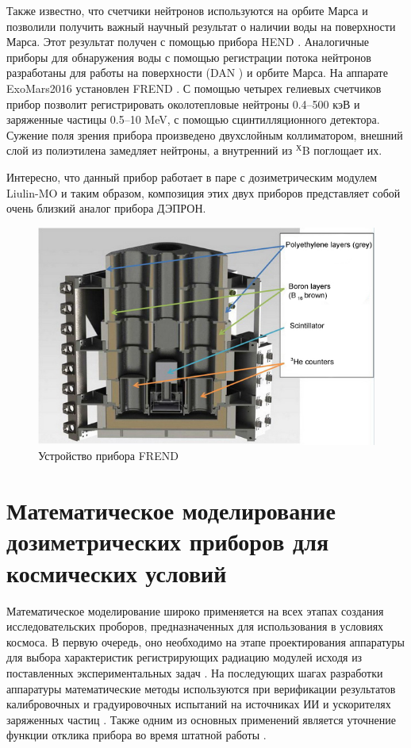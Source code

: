 Также известно, что счетчики нейтронов используются на орбите Марса и позволили получить важный научный результат о наличии воды на поверхности Марса.  Этот  результат получен с помощью прибора HEND \cite{Feldman2004}. Аналогичные приборы для обнаружения воды с помощью регистрации потока нейтронов разработаны для работы на поверхности (DAN \cite{Mitrofanov2012a}) и орбите Марса. На аппарате ExoMars2016 установлен FREND \cite{Mitrofanov2012}. С помощью четырех гелиевых счетчиков прибор позволит регистрировать околотепловые нейтроны 0.4–500 кэВ и заряженные частицы 0.5–10 MeV, с помощью сцинтилляционного детектора. Сужение поля зрения прибора произведено двухслойным коллиматором, внешний слой из полиэтилена замедляет нейтроны, а внутренний из $ ^Х $B поглощает их. 

Интересно, что данный прибор работает в паре с дозиметрическим модулем Liulin-MO и таким образом, композиция этих двух приборов представляет собой очень близкий аналог прибора ДЭПРОН.
\begin{figure}
	\centering
	\includegraphics[width=0.7\linewidth]{images/frend3-eng}
	\caption{Устройство прибора FREND \cite{Mitrofanov2012}}
	\label{fig:frend3-eng}
\end{figure}

\section{Математическое моделирование дозиметрических приборов для космических условий}

Математическое моделирование широко применяется на всех этапах создания исследовательских проборов, предназначенных для использования в условиях космоса. В первую очередь, оно необходимо на этапе проектирования аппаратуры для выбора характеристик регистрирующих радиацию модулей исходя из поставленных экспериментальных задач \cite{Hassler2008}. На последующих шагах разработки аппаратуры математические методы используются при верификации результатов калибровочных и градуировочных испытаний на источниках ИИ и ускорителях заряженных частиц \cite{Zeitlin2010, Luszik-Bhadra2008} . Также одним из основных применений является уточнение функции отклика прибора во время штатной работы \cite{Zeitlin2010}. 


